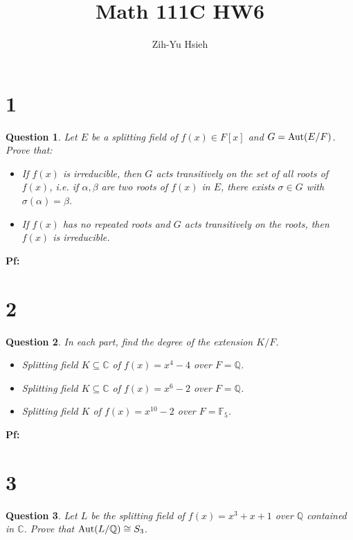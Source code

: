 \documentclass{article}
\title{Math 111C HW6}
\author{Zih-Yu Hsieh}
\newtheorem{question}{Question}
\begin{document}
\maketitle

\section*{1}
\begin{myBox}[]{}
    \begin{question}
        Let $E$ be a splitting field of $f(x)\in F[x]$ and $G=\textmd{Aut}(E/F)$. Prove that:
        \begin{itemize}
            \item[(a)] If $f(x)$ is irreducible, then $G$ acts transitively on the set of all roots of $f(x)$, i.e. if $\alpha,\beta$ are two roots of $f(x)$ in $E$, there exists $\sigma\in G$ with $\sigma(\alpha)=\beta$.
            \item[(b)] If $f(x)$ has no repeated roots and $G$ acts transitively on the roots, then $f(x)$ is irreducible. 
        \end{itemize}
    \end{question}
\end{myBox}

\textbf{Pf:}

\break

\section*{2}
\begin{myBox}[]{}
    \begin{question}
        In each part, find the degree of the extension $K/F$.
        \begin{itemize}
            \item[(a)] Splitting field $K\subseteq\mathbb{C}$ of $f(x)=x^4-4$ over $F=\mathbb{Q}$.
            \item[(b)] Splitting field $K\subseteq\mathbb{C}$ of $f(x)=x^6-2$ over $F=\mathbb{Q}$.
            \item[(c)] Splitting field $K$ of $f(x)=x^{10}-2$ over $F=\mathbb{F}_5$.  
        \end{itemize}
    \end{question}
\end{myBox}

\textbf{Pf:}

\break

\section*{3}
\begin{myBox}[]{}
    \begin{question}
        Let $L$ be the splitting field of $f(x)=x^3+x+1$ over $\mathbb{Q}$ contained in $\mathbb{C}$. Prove that $\textmd{Aut}(L/\mathbb{Q})\cong S_3$.
    \end{question}
\end{myBox}
\end{document}
